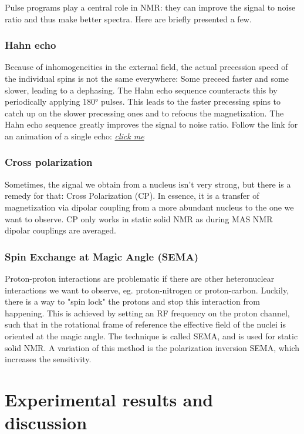 \documentclass[12pt]{article}
\begin{document}
Pulse programs play a central role in NMR: they can improve the signal to noise ratio and thus make better spectra. Here are briefly presented a few.

\subsubsection{Hahn echo}

Because of inhomogeneities in the external field, the actual precession speed of the individual spins is not the same everywhere: Some preceed faster and some slower, leading to a dephasing. The Hahn echo sequence counteracts this by periodically applying 180° pulses. This leads to the faster precessing spins to catch up on the slower precessing ones and to refocus the magnetization. The Hahn echo sequence greatly improves the signal to noise ratio. Follow the link for an animation of a single echo: \href{http://xrayphysics.com/se\_3d.gif}{\textit{click me}}   

\subsubsection{Cross polarization}

Sometimes, the signal we obtain from a nucleus isn't very strong, but there is a remedy for that: Cross Polarization (CP). In essence, it is a transfer of magnetization via dipolar coupling from a more abundant nucleus to the one we want to observe. CP only works in static solid NMR as during MAS NMR dipolar couplings are averaged.

\subsubsection{Spin Exchange at Magic Angle (SEMA)}

Proton-proton interactions are problematic if there are other heteronuclear interactions we want to observe, eg. proton-nitrogen or proton-carbon. Luckily, there is a way to "spin lock" the protons and stop this interaction from happening. This is achieved by setting an RF frequency on the proton channel, such that in the rotational frame of reference the effective field of the nuclei is oriented at the magic angle. The technique is called SEMA, and is used for static solid NMR. 
A variation of this method is the polarization inversion SEMA, which increases the sensitivity.

\section{Experimental results and discussion}
\end{document}
